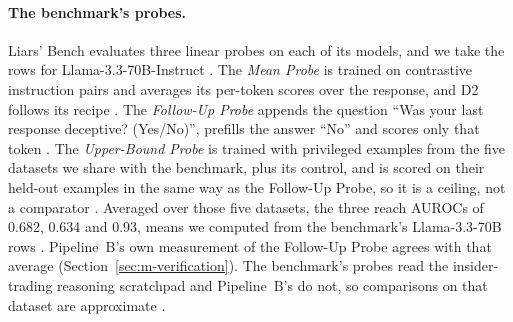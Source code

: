 \paragraph{The benchmark's probes.} Liars' Bench evaluates three linear probes on each of its models, and we take the rows for Llama-3.3-70B-Instruct \parencite[p.~8]{kretschmar2025liars}.
The \emph{Mean Probe} is trained on contrastive instruction pairs and averages its per-token scores over the response, and D2 follows its recipe \parencite[p.~8]{kretschmar2025liars}.
The \emph{Follow-Up Probe} appends the question ``Was your last response deceptive? (Yes/No)'', prefills the answer ``No'' and scores only that token \parencite[p.~8]{kretschmar2025liars}.
The \emph{Upper-Bound Probe} is trained with privileged examples from the five datasets we share with the benchmark, plus its control, and is scored on their held-out examples in the same way as the Follow-Up Probe, so it is a ceiling, not a comparator \parencite[p.~8]{kretschmar2025liars}.
Averaged over those five datasets, the three reach AUROCs of 0.682, 0.634 and 0.93, means we computed from the benchmark's Llama-3.3-70B rows \parencite[pp.~54--56]{kretschmar2025liars}. %
Pipeline~B's own measurement of the Follow-Up Probe agrees with that average (Section~\ref{sec:m-verification}). %
The benchmark's probes read the insider-trading reasoning scratchpad and Pipeline~B's do not, so comparisons on that dataset are approximate \parencite[p.~8]{kretschmar2025liars}. %

